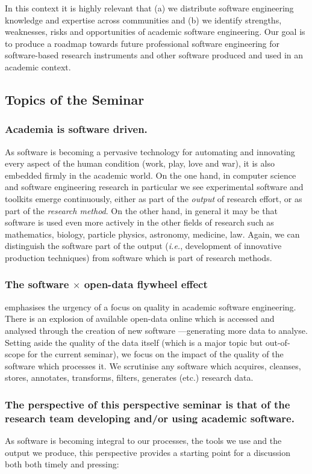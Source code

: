 \documentclass[a4paper,UKenglish]{dagman}
\renewcommand{\paragraph}[1]{\subsubsection*{#1}\xspace}
\newcommand{\ie}{\emph{i.e.},\xspace}
\begin{document}
In this context it is highly relevant that (a) we distribute software engineering knowledge and expertise across communities and (b) we identify  strengths, weaknesses, risks and opportunities of academic software engineering. Our goal is to produce a roadmap towards future professional software engineering for software-based research instruments and other software produced and used in an academic context.


\subsection*{Topics of the Seminar}

\paragraph{Academia is software driven.} As software is becoming a pervasive technology for automating and innovating every aspect of the human condition (work, play, love and war), it is also embedded firmly in the academic world. On the one hand, in computer science and software engineering research in particular we see experimental software and toolkits emerge continuously, either as part of the \emph{output} of research effort, or as part of the \emph{research method}. On the other hand, in general it may be that software is used even more actively in the other fields of research such as mathematics, biology, particle physics, astronomy, medicine, law. Again, we can distinguish the software part of the output (\ie development of innovative production techniques) from software which is part of research methods. 

\paragraph{The software $\times$ open-data flywheel effect} emphasises the urgency of a focus on quality in academic software engineering. There is an explosion of available open-data online which is accessed and analysed through the creation of new software ---generating more data to analyse. Setting aside the quality of the data itself (which is a major topic but out-of-scope for the current seminar), we focus on the impact of the quality of the software which processes it. We scrutinise any software which acquires, cleanses, stores, annotates, transforms, filters, generates (etc.) research data.

\paragraph{The perspective of this perspective seminar is that of the research team developing and/or using academic software.} As software is becoming integral to our processes, the tools we use and the output we produce, this perspective provides a starting point for a discussion both both timely and pressing:
\end{document}

